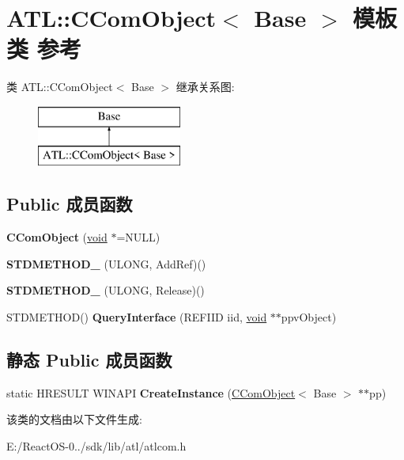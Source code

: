 \hypertarget{class_a_t_l_1_1_c_com_object}{}\section{A\+TL\+:\+:C\+Com\+Object$<$ Base $>$ 模板类 参考}
\label{class_a_t_l_1_1_c_com_object}
类 A\+TL\+:\+:C\+Com\+Object$<$ Base $>$ 继承关系图\+:\begin{figure}[H]
\begin{center}
\leavevmode
\includegraphics[height=2.000000cm]{class_a_t_l_1_1_c_com_object}
\end{center}
\end{figure}
\subsection*{Public 成员函数}
\begin{DoxyCompactItemize}
\item 
\mbox{\label{class_a_t_l_1_1_c_com_object_a5fcf98d5208c762f217e7c62d1bd9530}} 
{\bfseries C\+Com\+Object} (\hyperlink{interfacevoid}{void} $\ast$=N\+U\+LL)
\item 
\mbox{\label{class_a_t_l_1_1_c_com_object_a1c94d4872662e798c46747f4ae373f10}} 
{\bfseries S\+T\+D\+M\+E\+T\+H\+O\+D\+\_\+} (U\+L\+O\+NG, Add\+Ref)()
\item 
\mbox{\label{class_a_t_l_1_1_c_com_object_a19048c01e78bdb2a73e5cc777de2a462}} 
{\bfseries S\+T\+D\+M\+E\+T\+H\+O\+D\+\_\+} (U\+L\+O\+NG, Release)()
\item 
\mbox{\label{class_a_t_l_1_1_c_com_object_a3f31c0da1abc33e8ae981bb34c0c1a8b}} 
S\+T\+D\+M\+E\+T\+H\+OD() {\bfseries Query\+Interface} (R\+E\+F\+I\+ID iid, \hyperlink{interfacevoid}{void} $\ast$$\ast$ppv\+Object)
\end{DoxyCompactItemize}
\subsection*{静态 Public 成员函数}
\begin{DoxyCompactItemize}
\item 
\mbox{\label{class_a_t_l_1_1_c_com_object_a076ebc8397662eb24b39a7fcad6a9b63}} 
static H\+R\+E\+S\+U\+LT W\+I\+N\+A\+PI {\bfseries Create\+Instance} (\hyperlink{class_a_t_l_1_1_c_com_object}{C\+Com\+Object}$<$ Base $>$ $\ast$$\ast$pp)
\end{DoxyCompactItemize}


该类的文档由以下文件生成\+:\begin{DoxyCompactItemize}
\item 
E\+:/\+React\+O\+S-\/0../sdk/lib/atl/atlcom.\+h\end{DoxyCompactItemize}
